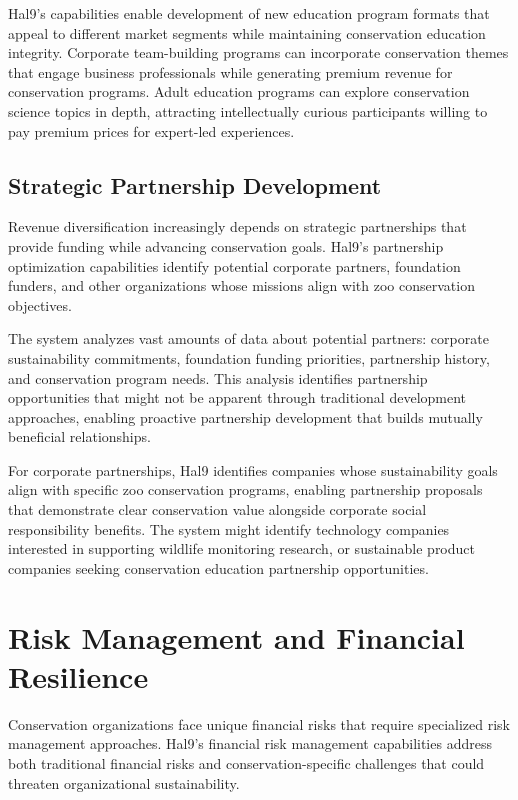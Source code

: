 \documentclass[
  Letterpaper,
]{scrbook}
\begin{document}
Hal9's capabilities enable development of new education program formats
that appeal to different market segments while maintaining conservation
education integrity. Corporate team-building programs can incorporate
conservation themes that engage business professionals while generating
premium revenue for conservation programs. Adult education programs can
explore conservation science topics in depth, attracting intellectually
curious participants willing to pay premium prices for expert-led
experiences.

\subsection{Strategic Partnership
Development}\label{strategic-partnership-development}

Revenue diversification increasingly depends on strategic partnerships
that provide funding while advancing conservation goals. Hal9's
partnership optimization capabilities identify potential corporate
partners, foundation funders, and other organizations whose missions
align with zoo conservation objectives.

The system analyzes vast amounts of data about potential partners:
corporate sustainability commitments, foundation funding priorities,
partnership history, and conservation program needs. This analysis
identifies partnership opportunities that might not be apparent through
traditional development approaches, enabling proactive partnership
development that builds mutually beneficial relationships.

For corporate partnerships, Hal9 identifies companies whose
sustainability goals align with specific zoo conservation programs,
enabling partnership proposals that demonstrate clear conservation value
alongside corporate social responsibility benefits. The system might
identify technology companies interested in supporting wildlife
monitoring research, or sustainable product companies seeking
conservation education partnership opportunities.

\section{Risk Management and Financial
Resilience}\label{risk-management-and-financial-resilience}

Conservation organizations face unique financial risks that require
specialized risk management approaches. Hal9's financial risk management
capabilities address both traditional financial risks and
conservation-specific challenges that could threaten organizational
sustainability.
\end{document}
